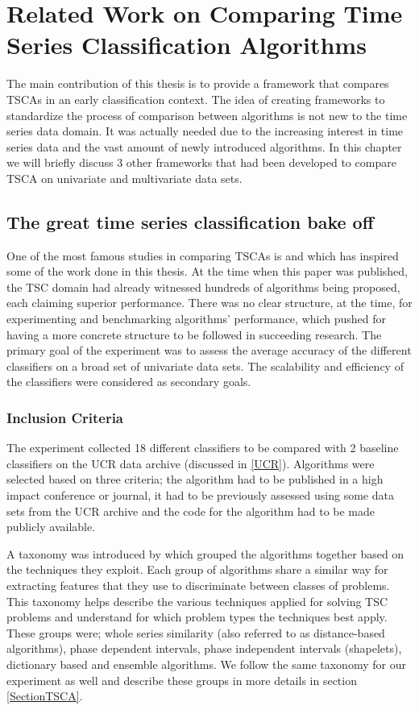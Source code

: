 \chapter{Related Work on Comparing Time Series Classification Algorithms}
\label{ChapterRelatedWork}
The main contribution of this thesis is to provide a framework that compares TSCAs in an early classification context.
The idea of creating frameworks to standardize the process of comparison between algorithms is not new to the time series data domain.
It was actually needed due to the increasing interest in time series data and the vast amount of newly introduced algorithms.
In this chapter we will briefly discuss 3 other frameworks that had been developed to compare TSCA on univariate and multivariate data sets.

\section{The great time series classification bake off}
\label{GreatBakeoffUnivariate}
One of the most famous studies in comparing TSCAs is \cite{bagnall2017great} and which has inspired some of the work done in this thesis.
At the time when this paper was published, the TSC domain had already witnessed hundreds of algorithms being proposed, each claiming superior performance.
There was no clear structure, at the time, for experimenting and benchmarking algorithms' performance, which pushed for having a more concrete structure to be followed in succeeding research.
The primary goal of the experiment was to assess the average accuracy of the different classifiers on a broad set of univariate data sets.
The scalability and efficiency of the classifiers were considered as secondary goals.

\subsection{Inclusion Criteria}
\label{subsectionUniBakeoffInclusion}
The experiment collected 18 different classifiers to be compared with 2 baseline classifiers on the UCR data archive (discussed in \ref{UCR}).
Algorithms were selected based on three criteria; the algorithm had to be published in a high impact conference or journal, it had to be previously assessed using some data sets from the UCR archive
and the code for the algorithm had to be made publicly available.

A taxonomy was introduced by \cite{bagnall2017great} which grouped the algorithms together based on the techniques they exploit.
Each group of algorithms share a similar way for extracting features that they use to discriminate between classes of problems.
This taxonomy helps describe the various techniques applied for solving TSC problems and understand for which problem types the techniques best apply.
These groups were; whole series similarity (also referred to as distance-based algorithms), phase dependent intervals, phase independent intervals (shapelets), dictionary based and ensemble algorithms.
We follow the same taxonomy for our experiment as well and describe these groups in more details in section \ref{SectionTSCA}.

